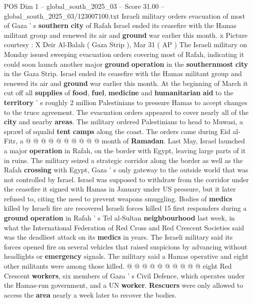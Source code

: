 \begin{textsample}{POS Dim 1 – global\_south\_2025\_03 – Score 31.00 – global\_south\_2025\_03/123007100.txt}  \label{ex:f1_pos_261}
Israeli military orders evacuation of most of Gaza ' s \textbf{southern} \textbf{city} of Rafah Israel ended its ceasefire with the Hamas militant group and renewed its air and \textbf{ground} war earlier this month. x Picture courtesy : X Deir Al-Balah ( Gaza Strip ), Mar 31 ( AP ) The Israeli military on Monday issued sweeping evacuation orders covering most of Rafah, indicating it could soon launch another major \textbf{ground} \textbf{operation} in the \textbf{southernmost} \textbf{city} in the Gaza Strip.
Israel ended its ceasefire with the Hamas militant group and renewed its air and \textbf{ground} war earlier this month.
At the beginning of March it cut off all \textbf{supplies} of \textbf{food}, \textbf{fuel}, \textbf{medicine} and \textbf{humanitarian} \textbf{aid} to the \textbf{territory} ' s roughly 2 million Palestinians to pressure Hamas to accept changes to the truce agreement.
The evacuation orders appeared to cover nearly all of the \textbf{city} and nearby \textbf{areas}.
The military ordered Palestinians to head to Muwasi, a sprawl of squalid \textbf{tent} \textbf{camps} along the coast.
The orders came during Eid al-Fitr, a @ @ @ @ @ @ @ @ @ @ month of \textbf{Ramadan}.
Last May, Israel launched a major \textbf{operation} in Rafah, on the border with Egypt, leaving large parts of it in ruins.
The military seized a strategic corridor along the border as well as the Rafah \textbf{crossing} with Egypt, Gaza ' s only gateway to the outside world that was not controlled by Israel.
Israel was supposed to withdraw from the corridor under the ceasefire it signed with Hamas in January under US pressure, but it later refused to, citing the need to prevent weapons smuggling.
Bodies of \textbf{medics} killed by Israeli fire are recovered Israeli forces killed 15 first responders during a \textbf{ground} \textbf{operation} in Rafah ' s Tel al-Sultan \textbf{neighbourhood} last week, in what the International Federation of Red Cross and Red Crescent Societies said was the deadliest attack on its \textbf{medics} in years.
The Israeli military said its forces opened fire on several vehicles that raised suspicions by advancing without headlights or \textbf{emergency} signals.
The military said a Hamas operative and eight other militants were among those killed. @ @ @ @ @ @ @ @ @ @ eight Red Crescent \textbf{workers}, six members of Gaza ' s Civil Defence, which operates under the Hamas-run government, and a UN \textbf{worker}. \textbf{Rescuers} were only allowed to access the \textbf{area} nearly a week later to recover the bodies.

\end{textsample}
